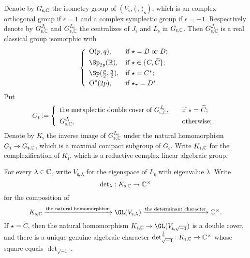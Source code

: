 \documentclass[12pt,a4paper]{amsart}
\newcommand{\oO}{\operatorname{O}}
\newcommand{\R}{\mathbb R}
\newcommand{\la}{\langle}
\newcommand{\ra}{\rangle}
\newcommand{\be}{\begin {equation}}
\newcommand{\ee}{\end {equation}}
\numberwithin{equation}{section}
\theoremstyle{remark}
\begin{document}
Denote by $G_{\mathsf s, \mathbb{C}}$ the isometry group of $ (V_{\mathsf s}, \la\,,\,\ra_{\mathsf s})$, which is an complex orthogonal group if $\epsilon=1$ and a complex symplectic group if $\epsilon=-1$. Respectively denote by  $G_{\mathsf s, \mathbb{C}}^{J_\mathsf s}$  and  $G_{\mathsf s, \mathbb{C}}^{L_\mathsf s}$ the centralizes of $J_\mathsf s$ and $L_\mathsf s$ in  $G_{\mathsf s, \mathbb{C}}$. Then $G_{\mathsf s, \mathbb{C}}^{J_\mathsf s}$ is a real classical group isomorphic with
\[
 \left\{
     \begin{array}{ll}
         \oO(p, q), &\hbox{if $\star=B$ or $D$}; \smallskip\\
            \Sp_{2p}(\R), &\hbox{if $\star\in \{C,\widetilde C\}$}; \smallskip\\
                   \Sp(\frac{p}{2}, \frac{q}{2}), &\hbox{if $\star=C^*$}; \smallskip \\
          \oO^*(2p), &\hbox{if $\star_\tau=D^*$}.\\
            \end{array}
   \right.
\]
Put
\[
G_\mathsf s:= \left\{
     \begin{array}{ll}
       \textrm{the metaplectic double cover of $G_{\mathsf s, \C}^{J_\mathsf s}$}, \quad &\hbox{if $\star=\widetilde C$}; \smallskip\\
            G_{\mathsf s, \C}^{J_\mathsf s},  \quad  &\hbox{otherwise};.\\
            \end{array}
   \right.
\]
Denote by $K_{\mathsf s}$ the inverse image of  $G_{\mathsf s, \mathbb{C}}^{L_\mathsf s}$  under the natural homomorphism $G_\mathsf s\rightarrow G_{\mathsf s,\mathbb{C}}$, which is a maximal compact subgroup of $G_{\mathsf s}$. Write $K_{\mathsf s, \mathbb{C}}$ for the complexification of  $K_{\mathsf s}$, which is a reductive complex linear algebraic group.

For every $\lambda\in \mathbb{C}$, write $V_{\mathsf s, \lambda}$ for the eigenspace of $L_{\mathsf s}$ with eigenvalue $\lambda$. Write
\[
{\det}_\lambda : K_{\mathsf s, \mathbb{C}}\rightarrow \mathbb{C}^\times
\]
for the composition of
\be\label{comdet}
   K_{\mathsf s, \C}\xrightarrow{\textrm{the natural homomorphism}} \GL(V_{\mathsf s, \lambda})\xrightarrow{\textrm{the determinant character}}\C^\times.
\ee
If $\star=\widetilde C$, then the natural homomorphism  $ K_{\mathsf s, \C}\rightarrow \GL(V_{\mathsf s, \sqrt{-1}})$ is a double cover, and there is a unique genuine algebraic character
$\det_{\sqrt{-1}}^{\frac{1}{2}}:  K_{\mathsf s, \mathbb{C}}\rightarrow \mathbb{C}^\times $ whose square equals $\det_{\sqrt{-1}}$.
\end{document}
